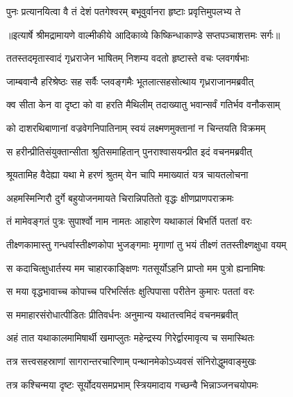 \twolineshloka
{पुनः प्रत्यानयित्वा वै तं देशं पतगेश्वरम्}
{बभूवुर्वानरा हृष्टाः प्रवृत्तिमुपलभ्य ते} %


{॥इत्यार्षे श्रीमद्रामायणे वाल्मीकीये आदिकाव्ये किष्किन्धाकाण्डे सप्तपञ्चाशत्तमः सर्गः॥}


\twolineshloka
{ततस्तदमृतास्वादं गृध्रराजेन भाषितम्}
{निशम्य वदतो हृष्टास्ते वचः प्लवगर्षभाः} %

\twolineshloka
{जाम्बवान्वै हरिश्रेष्ठः सह सर्वैः प्लवङ्गमैः}
{भूतलात्सहसोत्थाय गृध्रराजानमब्रवीत्} %

\twolineshloka
{क्व सीता केन वा दृष्टा को वा हरति मैथिलीम्}
{तदाख्यातु भवान्सर्वं गतिर्भव वनौकसाम्} %

\twolineshloka
{को दाशरथिबाणानां वज्रवेगनिपातिनाम्}
{स्वयं लक्ष्मणमुक्तानां न चिन्तयति विक्रमम्} %

\twolineshloka
{स हरीन्प्रीतिसंयुक्तान्सीता श्रुतिसमाहितान्}
{पुनराश्वासयन्प्रीत इदं वचनमब्रवीत्} %

\twolineshloka
{श्रूयतामिह वैदेह्या यथा मे हरणं श्रुतम्}
{येन चापि ममाख्यातं यत्र चायतलोचना} %

\twolineshloka
{अहमस्मिन्गिरौ दुर्गे बहुयोजनमायते}
{चिरान्निपतितो वृद्धः क्षीणप्राणपराक्रमः} %

\twolineshloka
{तं मामेवङ्गतं पुत्रः सुपार्श्वो नाम नामतः}
{आहारेण यथाकालं बिभर्ति पततां वरः} %

\twolineshloka
{तीक्ष्णकामास्तु गन्धर्वास्तीक्ष्णकोपा भुजङ्गमाः}
{मृगाणां तु भयं तीक्ष्णं ततस्तीक्ष्णक्षुधा वयम्} %

\twolineshloka
{स कदाचित्क्षुधार्तस्य मम चाहारकाङ्क्षिणः}
{गतसूर्योऽहनि प्राप्तो मम पुत्रो ह्यनामिषः} %

\twolineshloka
{स मया वृद्धभावाच्च कोपाच्च परिभर्त्सितः}
{क्षुत्पिपासा परीतेन कुमारः पततां वरः} %

\twolineshloka
{स ममाहारसंरोधात्पीडितः प्रीतिवर्धनः}
{अनुमान्य यथातत्त्वमिदं वचनमब्रवीत्} %

\twolineshloka
{अहं तात यथाकालमामिषार्थी खमाप्लुतः}
{महेन्द्रस्य गिरेर्द्वारमावृत्य च समास्थितः} %

\twolineshloka
{तत्र सत्त्वसहस्राणां सागरान्तरचारिणाम्}
{पन्थानमेकोऽध्यवसं संनिरोद्धुमवाङ्मुखः} %

\twolineshloka
{तत्र कश्चिन्मया दृष्टः सूर्योदयसमप्रभाम्}
{स्त्रियमादाय गच्छन्वै भिन्नाञ्जनचयोपमः} %

